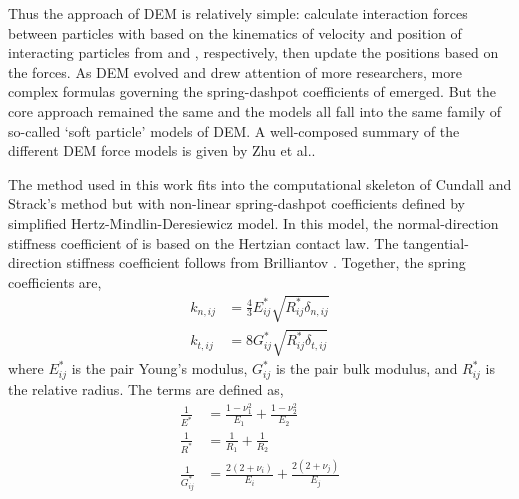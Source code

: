 \documentclass[11pt]{report} %
\begin{document}
Thus the approach of DEM is relatively simple: calculate interaction forces between particles with  based on the kinematics of velocity and position of interacting particles from  and , respectively, then update the positions based on the forces. As DEM evolved and drew attention of more researchers, more complex formulas governing the spring-dashpot coefficients of  emerged. But the core approach remained the same and the models all fall into the same family of so-called `soft particle' models of DEM. A well-composed summary of the different DEM force models is given by Zhu et al..\cite{Zhu2007}

The method used in this work fits into the computational skeleton of Cundall and Strack's method but with non-linear spring-dashpot coefficients defined by simplified Hertz-Mindlin-Deresiewicz model. In this model, the normal-direction stiffness coefficient of  is based on the Hertzian contact law. The tangential-direction stiffness coefficient follows from Brilliantov \cite{Brilliantov1996, Zhu2007, Langston1995}. Together, the spring coefficients are,
\begin{subequations}
\begin{align}
	k_{n,ij} &= \frac{4}{3}E_{ij}^*\sqrt{R_{ij}^*\delta_{n,ij}} \\
	k_{t,ij} &= 8 G_{ij}^*\sqrt{R_{ij}^*\delta_{t,ij}}
\end{align}
\end{subequations}
where $E_{ij}^*$ is the pair Young's modulus, $G_{ij}^*$ is the pair bulk modulus, and $R_{ij}^*$ is the relative radius. The terms are defined as,
\begin{subequations}
\begin{align}
	\frac{1}{E^*} &= \frac{1-\nu_1^2}{E_1} + \frac{1-\nu_2^2}{E_2} \\
	\frac{1}{R^*} &= \frac{1}{R_1} + \frac{1}{R_2} \\
	\frac{1}{G^*_{ij}} &= \frac{2(2+\nu_i)}{E_i} + \frac{2(2+\nu_j)}{E_j}
\end{align}
\end{subequations}
\end{document}
